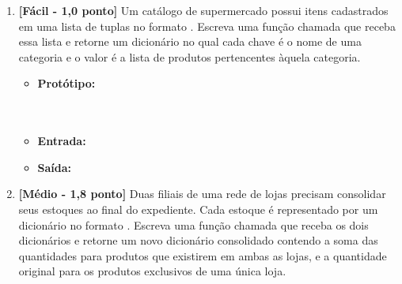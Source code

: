\begin{enumerate}[label=\textbf{Q\arabic*.}, start=59]
\begin{itemize}[leftmargin=*]
    \item \textbf{Protótipo:}\newline {}\\
    \item \textbf{Entrada:} 
    \item \textbf{Saída:} 
\end{itemize}



\vspace{0.4cm}

\item \textbf{[Fácil - 1,0 ponto]} Um catálogo de supermercado possui itens cadastrados em uma lista de tuplas no formato . Escreva uma função chamada  que receba essa lista e retorne um dicionário no qual cada chave é o nome de uma categoria e o valor é a lista de produtos pertencentes àquela categoria.

\begin{itemize}[leftmargin=*]
    \item \textbf{Protótipo:}\newline {}\\\\\\
    \item \textbf{Entrada:} \\
    \item \textbf{Saída:} \\
\end{itemize}



\vspace{0.4cm}

\item \textbf{[Médio - 1,8 ponto]} Duas filiais de uma rede de lojas precisam consolidar seus estoques ao final do expediente. Cada estoque é representado por um dicionário no formato . Escreva uma função chamada  que receba os dois dicionários e retorne um novo dicionário consolidado contendo a soma das quantidades para produtos que existirem em ambas as lojas, e a quantidade original para os produtos exclusivos de uma única loja.


\end{enumerate}
